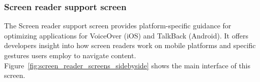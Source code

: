 \subsubsection{Screen reader support screen}
\label{subsubsec:screen-reader-support}

The Screen reader support screen provides platform-specific guidance for optimizing applications for VoiceOver (iOS) and TalkBack (Android). It offers developers insight into how screen readers work on mobile platforms and specific gestures users employ to navigate content. Figure~\ref{fig:screen_reader_screens_sidebyside} shows the main interface of this screen.

\begin{figure}[ht]
    \centering
    \begin{subfigure}[b]{0.48\textwidth}
        \centering

\end{subfigure}
\end{figure}
